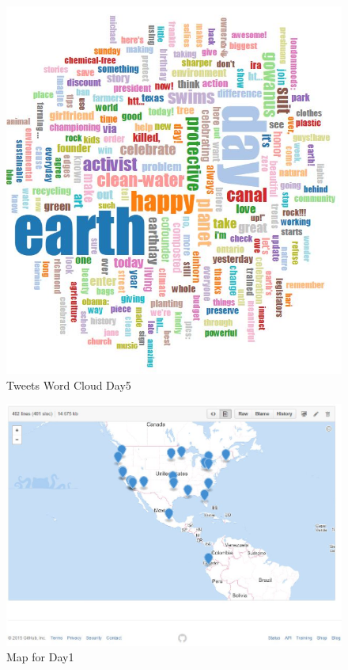 \begin{figure}[ht]
	\begin{center}
		 \includegraphics[scale=0.90]{wordcloudday5}
		  \caption{Tweets Word Cloud Day5}
	 \end{center}
\end{figure}
\begin{figure}[ht]
	\begin{center}
		 \includegraphics[scale=0.60]{geo1}
		  \caption{Map for Day1}
	 \end{center}
\end{figure}

